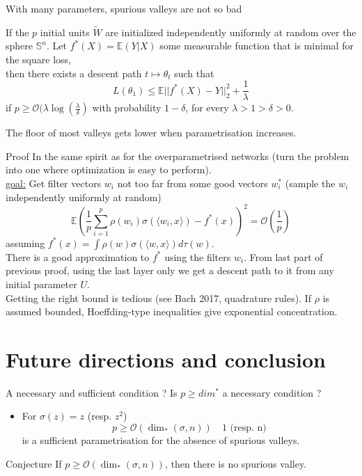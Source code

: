 \documentclass{beamer}
\begin{document}
\begin{frame}{With many parameters, spurious valleys are not so bad}
	\begin{theorem}
		If the $p$ initial units $\tilde W$ are initialized independently uniformly at random over the sphere $\mathbb{S}^n$. Let $f^*(X) = \mathbb{E}(Y|X)$ some measurable function that is minimal for the square loss, \\
		then there exists a descent path $t\mapsto \theta_t$
 such that
		\begin{equation*}
			L(\theta_1) \leq \mathbb{E}||f^*(X) - Y||_2^2 + \frac{1}{\lambda}
		\end{equation*}
		if $p\geq \mathcal{O}(\lambda \log(\frac{\lambda}{\delta})$ with probability $1-\delta$, for every $\lambda > 1 > \delta > 0.$
	\end{theorem}
The floor of most valleys gets lower when parametrisation increases. 
\end{frame}


\begin{frame}{Proof}
	In the same spirit as for the overparametrised networks (turn the problem into one where optimization is easy to perform).\\
	\underline{goal:} Get filter vectors $w_i$ not too far from some good vectors $w_i^*$ (sample the $w_i$ independently uniformly at random) \\
	\begin{equation*}
		\mathbb{E}\left(\frac{1}{p}\sum_{i=1}^p \rho(w_i)\sigma(\langle w_i, x\rangle) - f^*(x)\right)^2 = \mathcal{O}\left(\frac{1}{p}\right)
	\end{equation*}
	assuming $f^*(x) = \int \rho(w)\sigma(\langle w, x\rangle)d\tau(w)$.\\
	There is a good approximation to $f^*$ using the filters $w_i$. From last part of previous proof, using the last layer only we get a descent path to it from any initial parameter $U$.\\
	Getting the right bound is tedious (see Bach 2017, quadrature rules). If $\rho$ is assumed bounded, Hoeffding-type inequalities give exponential concentration.
\end{frame}

\section{Future directions and conclusion}
\begin{frame}{A necessary and sufficient condition ?}
	Is $p\geq dim^*$ a necessary condition ? 
	\begin{itemize}
		\item For $\sigma(z) = z$ (resp. $z^2$)
			\begin{equation*}
				p\geq \mathcal{O}(\dim_*(\sigma, n)) \quad\text{1 (resp. n)}
			\end{equation*}
			is a sufficient parametrisation for the absence of spurious valleys.
	\end{itemize}
	\begin{block}{Conjecture}
		If $p\geq\mathcal{O}(\dim_*(\sigma, n))$, then there is no spurious valley.
	\end{block}
\end{frame}
\end{document}
